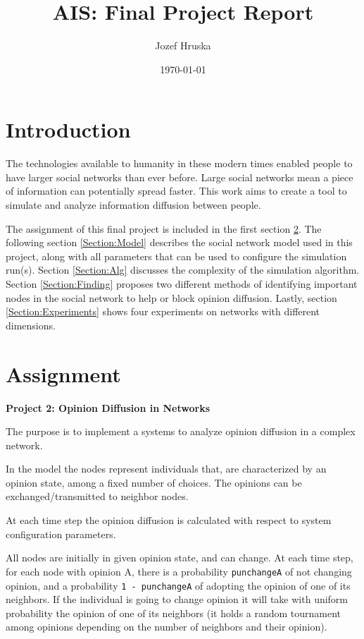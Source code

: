 \documentclass[11pt]{article}
\title{AIS: Final Project Report}
\author{Jozef Hruska}
\date{\today}
\begin{document}
\maketitle

\section{Introduction}

\noindent The technologies available to humanity in these modern times enabled people to have larger social networks than ever before. Large social networks mean a piece of information can potentially spread faster. This work aims to create a tool to simulate and analyze information diffusion between people.

\medskip

\noindent The assignment of this final project is included in the first section \ref{Section:Assignment}. The following section \ref{Section:Model} describes the social network model used in this project, along with all parameters that can be used to configure the simulation run(s). Section \ref{Section:Alg} discusses the complexity of the simulation algorithm. Section \ref{Section:Finding} proposes two different methods of identifying important nodes in the social network to help or block opinion diffusion. Lastly, section \ref{Section:Experiments} shows four experiments on networks with different dimensions.

\section{Assignment}
\label{Section:Assignment}

\textbf{Project 2: Opinion Diffusion in Networks}

\medskip

\noindent The purpose is to implement a systems to analyze opinion diffusion in a complex network.

\medskip

\noindent In the model the nodes represent individuals that, are characterized by an opinion state, among a fixed number of choices. The opinions can be exchanged/transmitted to neighbor nodes.

\medskip

\noindent At each time step the opinion diffusion is calculated with respect to system configuration parameters.

\medskip

\noindent All nodes are initially in given opinion state, and can change. At each time step, for each node with opinion A, there is a probability \verb|punchangeA| of not changing opinion, and a probability \verb|1 - punchangeA| of adopting the opinion of one of its neighbors. If the individual is going to change opinion it will take with uniform probability the opinion of one of its neighbors (it holds a random tournament among opinions depending on the number of neighbors and their opinion).
\end{document}
